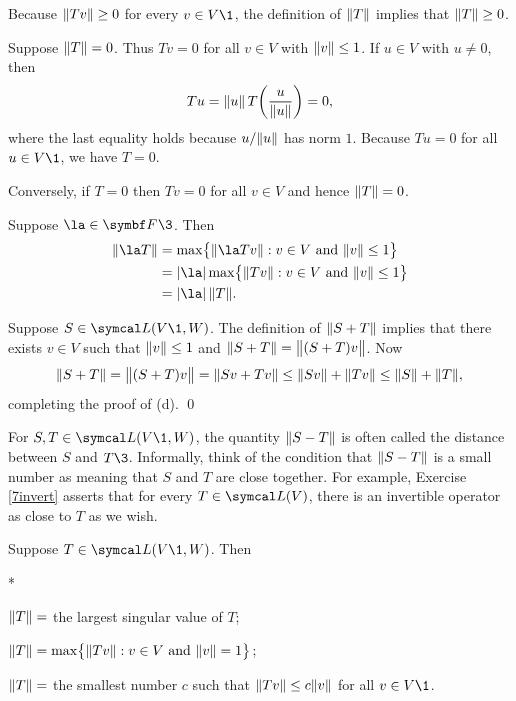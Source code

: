 \proof
\begin{subtheorem}
\item
Because $\norm{Tv} \ge 0$ for every $v \in V\1$, the definition of $\norm{T}$ implies that $\norm{T} \ge 0$.

\item
Suppose $\norm{T} = 0$. Thus $Tv = 0$ for all $v \in V$ with $\norm{v} \le 1$. If $u \in V$ with $u \ne 0$, then
\vspace{-.1in}
\[
Tu = \norm{u} \, T\paren[\bigg]{ \frac{u}{\norm{u} } } = 0,
\]
where the last equality holds because $u/\norm{u}$ has norm $1$. Because $Tu = 0$ for all $u \in V\1$, we have $T = 0$.

Conversely, if $T = 0$ then $Tv = 0$ for all $v \in V$ and hence $\norm{T} = 0$.

\item
Suppose $\la \in \F{}\3$. Then
\begin{align*}
\norm{\la T} &= \max \br[\big]{ \norm{\la Tv} : v \in V \text{ and } \norm{v} \le 1} \\
&= \abs{\la} \max \br[\big]{ \norm{Tv} : v \in V \text{ and } \norm{v} \le 1} \\
&= \abs{\la} \, \norm{T}.
\end{align*}

\item
Suppose $S \in \L(V\1,W)$. The definition of $\norm{S+T}$ implies that there exists $v \in V$ such that $\norm{v} \le 1$ and \mbox{$\norm{S + T} = \norm[\big]{(S+T)v}$}. Now
\[
\norm{S+T} = \norm[\big]{(S+T)v} = \norm{Sv + Tv} \le \norm{Sv} + \norm{Tv} \le \norm{S} + \norm{T},
\]
completing the proof of (d).
\qed
\end{subtheorem}

\pagebreak[3]

For $S, T \in \L(V\1,W)$, the quantity $\norm{S-T}$ is often called the distance between $S$ and $T\3$. Informally, think of the condition that $\norm{S-T}$ is a small number as meaning that $S$ and $T$ are close together. For example, Exercise \ref{7invert} asserts that for every $T \in \L(V)$, there is an invertible operator as close to $T$ as we wish.

{Suppose $T \in \L(V\1, W)$. Then
\begin{subtheorem}*
\item
$\norm{T} =$ the largest singular value of $T$;
\item
$\norm{T} = \max \br[\big]{ \norm{Tv} : v \in V \text{ and } \norm{v} = 1}$;
\item
$\norm{T} =$ the smallest number $c$ such that $\norm{Tv} \le c \norm{v}$ for all $v \in V\1$.
\end{subtheorem}}

